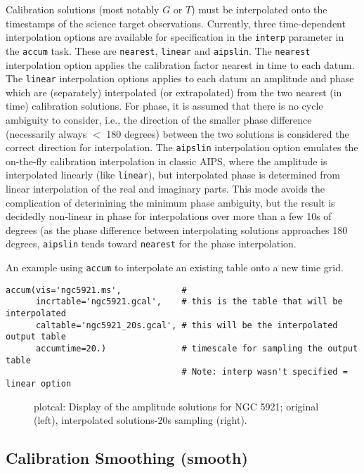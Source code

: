 Calibration solutions (most notably $G$ or $T$) must be interpolated
onto the timestamps of the science target observations.  Currently,
three time-dependent interpolation options are available for
specification in the {\tt interp} parameter in the {\tt accum} task.  These
are {\tt nearest}, {\tt linear} and {\tt aipslin}.  The {\tt nearest}
interpolation option applies the calibration factor nearest in time to
each datum.  The {\tt linear} interpolation options applies to each
datum an amplitude and phase which are (separately) interpolated (or
extrapolated) from the two nearest (in time) calibration
solutions. For phase, it is assumed that there is no cycle ambiguity
to consider, i.e., the direction of the smaller phase difference
(necessarily always $<$ 180 degrees) between the two solutions is
considered the correct direction for interpolation.  The {\tt aipslin}
interpolation option emulates the on-the-fly calibration interpolation
in classic AIPS, where the amplitude is interpolated linearly (like
{\tt linear}), but interpolated phase is determined from linear
interpolation of the real and imaginary parts.  This mode avoids the
complication of determining the minimum phase ambiguity, but the result
is decidedly non-linear in phase for interpolations over more than a
few 10s of degrees (as the phase difference between interpolating solutions
approaches 180 degrees, {\tt aipslin} tends toward {\tt nearest}
for the phase interpolation.

An example using {\tt accum} to interpolate an existing table onto a new
time grid.

\small
\begin{verbatim}
accum(vis='ngc5921.ms',            #
      incrtable='ngc5921.gcal',    # this is the table that will be interpolated
      caltable='ngc5921_20s.gcal', # this will be the interpolated output table
      accumtime=20.)               # timescale for sampling the output table
                                   # Note: interp wasn't specified = linear option
\end{verbatim}
\normalsize

\begin{figure}[h!]
\caption{\label{fig:plotcal_G} plotcal: Display of the amplitude
  solutions for NGC 5921; original (left), interpolated solutions-20s
  sampling (right).} 
\hrulefill
\end{figure}


\subsection{Calibration Smoothing ({\rm smooth})}
\label{subsection:synth.cal.smooth}

